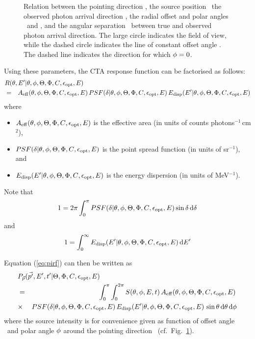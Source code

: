 \documentclass{article}[12pt,a4]
\begin{document}
\begin{figure}[!b]
\center
{}
\caption{Relation between the pointing direction \teldir, the source position \srcdir\,
the observed photon arrival direction \phdir, the radial offset and polar angles \off\ and
\polar, and the angular separation \psfsep\ between true and observed photon arrival 
direction.
The large circle indicates the field of view, while the dashed circle indicates
the line of constant offset angle \off.
The dashed line indicates the direction for which $\mbox{$\phi$}=0$.
}
 \label{fig:ctapsf}
\end{figure}

Using these parameters, the CTA response function can be factorised as follows:
\begin{eqnarray}
\lefteqn{R(\theta, E' | \off, \polar, \zen, \azm, \conf, \opt, E)} \nonumber \\
& = &A_{\rm eff}(\off, \polar, \zen, \azm, \conf, \opt, E) \,
PSF(\psfsep | \off, \polar, \zen, \azm, \conf, \opt, E) \,
E_{\rm disp}(E' | \off, \polar, \zen, \azm, \conf, \opt, E)
\label{eq:ctarsp}
\end{eqnarray}
where
\begin{itemize}
\item $A_{\rm eff}(\mbox{$\theta$}, \mbox{$\phi$}, \mbox{$\Theta$}, \mbox{$\Phi$}, \mbox{$C$}, \mbox{$\epsilon_{\rm opt}$}, E)$ is the effective area 
(in units of counts photons$^{-1}$\,cm$^2$),
\item $PSF(\mbox{$\delta$} | \mbox{$\theta$}, \mbox{$\phi$}, \mbox{$\Theta$}, \mbox{$\Phi$}, \mbox{$C$}, \mbox{$\epsilon_{\rm opt}$}, E)$ is the point spread function
  (in units of sr$^{-1}$), and
\item $E_{\rm disp}(E' | \mbox{$\theta$}, \mbox{$\phi$}, \mbox{$\Theta$}, \mbox{$\Phi$}, \mbox{$C$}, \mbox{$\epsilon_{\rm opt}$}, E)$ is the energy dispersion
  (in units of MeV$^{-1}$).
\end{itemize}
Note that
\begin{equation}
1 = 2 \pi \int_0^{\pi} PSF(\mbox{$\delta$} | \mbox{$\theta$}, \mbox{$\phi$}, \mbox{$\Theta$}, \mbox{$\Phi$}, \mbox{$C$}, \mbox{$\epsilon_{\rm opt}$}, E) \sin \mbox{$\delta$} \, {\rm d}\mbox{$\delta$}
\end{equation}
and
\begin{equation}
1 = \int_0^{\infty} E_{\rm disp}(E' | \mbox{$\theta$}, \mbox{$\phi$}, \mbox{$\Theta$}, \mbox{$\Phi$}, \mbox{$C$}, \mbox{$\epsilon_{\rm opt}$}, E) \, {\rm d}E'
\end{equation}

Equation (\ref{eq:pirf}) can then be written as
\begin{eqnarray}
\lefteqn{P_{\vec{p}}(\vec{p'}, E', t' | \zen, \azm, \conf, \opt, E)} & & \nonumber \\
& = & \int_0^{\pi} \int_0^{2 \pi} 
S(\off, \polar, E, t) \, A_{\rm eff}(\off, \polar, \zen, \azm, \conf, \opt, E) \, \nonumber \\
& \times &
PSF(\psfsep | \off, \polar, \zen, \azm, \conf, \opt, E) \,
E_{\rm disp}(E' | \off, \polar, \zen, \azm, \conf, \opt, E) \,
\sin \off \, {\rm d}\off \, {\rm d}\polar
\label{eq:ctapirf}
\end{eqnarray}
where the source intensity is for convenience given as function of offset angle
\off\ and polar angle $\mbox{$\phi$}$ around the pointing direction \teldir\ (cf.~Fig.~\ref{fig:ctapsf}).
\end{document}
